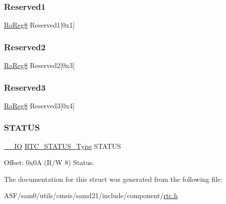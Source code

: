 \mbox{\label{struct_rtc_mode0_a092866123ac46d0985136e4dca2f36f4}} 
\subsubsection{\texorpdfstring{Reserved1}{Reserved1}}
{\footnotesize\ttfamily \mbox{\hyperlink{group___s_a_m_d21_e15_a__definitions_ga0d957f1433aaf5d70e4dc2b68288442d}{Ro\+Reg8}} Reserved1\mbox{[}0x1\mbox{]}}

\mbox{\label{struct_rtc_mode0_a3e3d4b7e35d84b272d434a1396e8b7be}} 
\subsubsection{\texorpdfstring{Reserved2}{Reserved2}}
{\footnotesize\ttfamily \mbox{\hyperlink{group___s_a_m_d21_e15_a__definitions_ga0d957f1433aaf5d70e4dc2b68288442d}{Ro\+Reg8}} Reserved2\mbox{[}0x3\mbox{]}}

\mbox{\label{struct_rtc_mode0_a85a9b205a274d973876024028f9ec39b}} 
\subsubsection{\texorpdfstring{Reserved3}{Reserved3}}
{\footnotesize\ttfamily \mbox{\hyperlink{group___s_a_m_d21_e15_a__definitions_ga0d957f1433aaf5d70e4dc2b68288442d}{Ro\+Reg8}} Reserved3\mbox{[}0x4\mbox{]}}

\mbox{\label{struct_rtc_mode0_a18fb82dd8352b8ac5b64e276ab0b5268}} 
\subsubsection{\texorpdfstring{STATUS}{STATUS}}
{\footnotesize\ttfamily \mbox{\hyperlink{core__cm0plus_8h_aec43007d9998a0a0e01faede4133d6be}{\+\_\+\+\_\+\+IO}} \mbox{\hyperlink{union_r_t_c___s_t_a_t_u_s___type}{R\+T\+C\+\_\+\+S\+T\+A\+T\+U\+S\+\_\+\+Type}} S\+T\+A\+T\+US}



Offset\+: 0x0A (R/W 8) Status. 



The documentation for this struct was generated from the following file\+:\begin{DoxyCompactItemize}
\item 
A\+S\+F/sam0/utils/cmsis/samd21/include/component/\mbox{\hyperlink{component_2rtc_8h}{rtc.\+h}}\end{DoxyCompactItemize}
